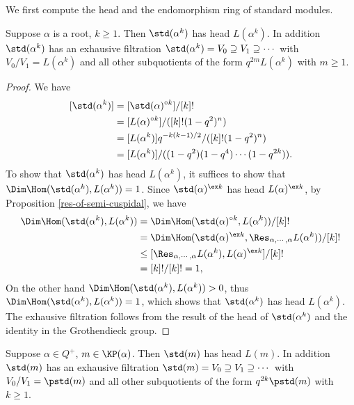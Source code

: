 We first compute the head and the endomorphism ring of standard modules.

\begin{lemma}
    Suppose $\alpha$ is a root, $k\ge 1$. Then $\std(\alpha^k)$
    has head $L(\alpha^k)$. In addition $\std(\alpha^k)$ has an exhausive
    filtration $\std(\alpha^k) = V_0\supseteq V_1\supseteq \cdots$
    with $V_0/V_1 = L(\alpha^k)$ and all other subquotients of the form
    $q^{2m}L(\alpha^k)$ with $m\ge 1$.
\end{lemma}

\begin{proof}
    We have 
    \[
    \begin{aligned}
        {[\std(\alpha^k)]}& = [\std(\alpha)^{\circ k}]/[k]!\\
        & = [L(\alpha)^{\circ k}]/([k]!(1-q^2)^n)\\
        & = [L(\alpha^k)]q^{-k(k-1)/2}/([k]!(1-q^2)^n)\\
        & = [L(\alpha^k)]/((1-q^2)(1-q^4)\cdots(1-q^{2k})).
    \end{aligned}
    \]
    To show that $\std(\alpha^k)$ has head $L(\alpha^k)$,
    it suffices to show that $\Dim\Hom(\std(\alpha^k),L(\alpha^k)) = 1$.
    Since $\std(\alpha)^{\ex k}$ has head $L(\alpha)^{\ex k}$,
    by Proposition \ref{res-of-semi-cuspidal}, we have 
    \[
    \begin{aligned}
        \Dim\Hom(\std(\alpha^k),L(\alpha^k))
        & = \Dim\Hom(\std(\alpha)^{\circ k},L(\alpha^k))/[k]!\\
        & = \Dim\Hom(\std(\alpha)^{\ex k},\Res_{\alpha,\cdots,\alpha}
         L(\alpha^k))/[k]!\\
        &\le[\Res_{\alpha,\cdots,\alpha}L(\alpha^k),L(\alpha)^{\ex k}]/[k]!\\
        & = [k]!/[k]! = 1,
    \end{aligned}
    \] 
    On the other hand $\Dim\Hom(\std(\alpha^k),L(\alpha^k))>0$,
    thus $\Dim\Hom(\std(\alpha^k),L(\alpha^k)) = 1$, which shows that
    $\std(\alpha^k)$ has head $L(\alpha^k)$. The exhausive
    filtration follows from the result of the head of $\std(\alpha^k)$
    and the identity in the Grothendieck group.
\end{proof}

\begin{proposition}
    Suppose $\alpha\in Q^+$, $m\in\KP(\alpha)$. Then $\std(m)$
    has head $L(m)$. In addition $\std(m)$ has an exhausive
    filtration $\std(m) = V_0\supseteq V_1\supseteq \cdots$
    with $V_0/V_1 = \pstd(m)$ and all other subquotients of the form
    $q^{2k}\pstd(m)$ with $k\ge 1$.
\end{proposition}

